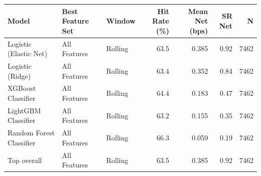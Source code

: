 \begin{tabular}{lllrrrr}
\toprule
Model & Best Feature Set & Window & Hit Rate (\%) & Mean Net (bps) & SR Net & N \\
\midrule
Logistic (Elastic Net) & All Features & Rolling & 63.5 & 0.385 & 0.92 & 7462 \\
Logistic (Ridge) & All Features & Rolling & 63.4 & 0.352 & 0.84 & 7462 \\
XGBoost Classifier & All Features & Rolling & 64.4 & 0.183 & 0.47 & 7462 \\
LightGBM Classifier & All Features & Rolling & 63.2 & 0.155 & 0.35 & 7462 \\
Random Forest Classifier & All Features & Rolling & 66.3 & 0.059 & 0.19 & 7462 \\
\midrule
Top overall & All Features & Rolling & 63.5 & 0.385 & 0.92 & 7462 \\
\bottomrule
\end{tabular}

